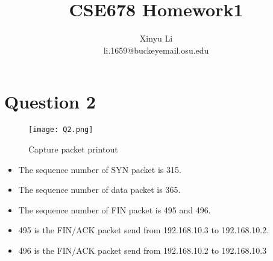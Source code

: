 \documentclass[a4paper,12pt]{article}
\begin{document}
\title{CSE678 Homework1}
\author{Xinyu Li\\li.1659@buckeyemail.osu.edu}
\maketitle
\section*{Question 2}
\begin{figure}[!htbp]
\texttt{[image: Q2.png]}
\caption{Capture packet printout}
\end{figure} 
\begin{itemize}
\item The sequence number of SYN packet is 315.\\
\item The sequence number of data packet is 365.\\
\item The sequence number of FIN packet is 495 and 496.\\
\item 495 is the FIN/ACK packet send from 192.168.10.3 to 192.168.10.2.\\
\item 496 is the FIN/ACK packet send from 192.168.10.2 to 192.168.10.3\\
\end{itemize}
\end{document}
